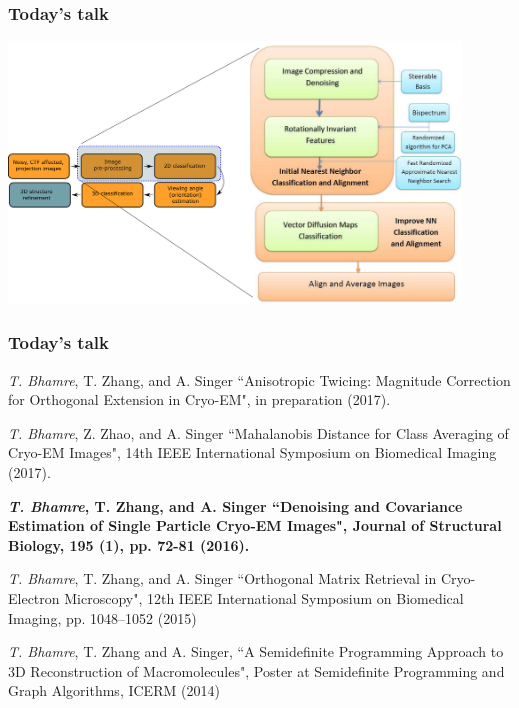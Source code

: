 \documentclass{beamer}
\begin{document}
\begin{frame}
\frametitle{Today's talk}
\begin{center}
\includegraphics[width=0.9\textwidth]{cryoem_pipeline_zoom.pdf}
\end{center}

\end{frame}



\begin{frame}
\frametitle{Today's talk}
\begin{itemize}
{\small
\item \textit{T. Bhamre}, T. Zhang, and A. Singer ``Anisotropic Twicing: Magnitude Correction for Orthogonal Extension in Cryo-EM", in preparation (2017).
\item \textit{T. Bhamre}, Z. Zhao, and A. Singer ``Mahalanobis Distance for Class Averaging of Cryo-EM Images", 14th IEEE International Symposium on Biomedical Imaging (2017).
\item \textbf{\textit{T. Bhamre}, T. Zhang, and A. Singer ``Denoising and Covariance Estimation of Single Particle Cryo-EM Images", Journal of Structural Biology, 195 (1), pp. 72-81 (2016).}
\item \textit{T. Bhamre}, T. Zhang, and A. Singer ``Orthogonal Matrix Retrieval in Cryo-Electron Microscopy", 12th IEEE International Symposium on Biomedical Imaging, pp. 1048--1052 (2015)
\item \textit{T. Bhamre}, T. Zhang and A. Singer, ``A Semidefinite Programming Approach to 3D Reconstruction
of Macromolecules", Poster at Semidefinite Programming and Graph Algorithms, ICERM (2014)
}
\end{itemize}

\end{frame}
\end{document}

